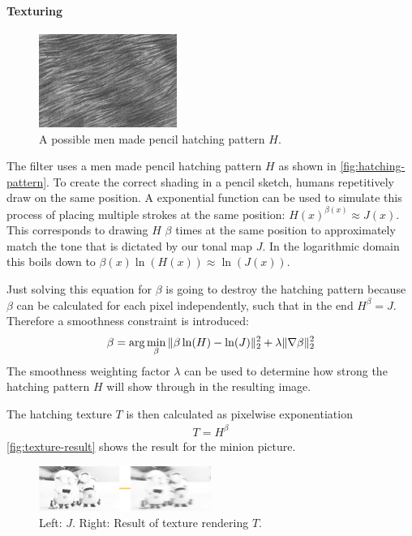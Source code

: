 \paragraph{Texturing}
\begin{figure}[htb]
  \centering
  \includegraphics[width=0.4\textwidth]{images/texture2.jpg}
  \caption{A possible men made pencil hatching pattern $H$.}
  \label{fig:hatching-pattern}
\end{figure}
The filter uses a men made pencil hatching pattern $H$ as shown in
\autoref{fig:hatching-pattern}. To create the correct shading in a pencil
sketch, humans repetitively draw on the same position. A exponential function
can be used to simulate this process of placing multiple strokes at the same
position: $H(x)^{\beta(x)} \approx J(x)$. This corresponds to drawing $H$
$\beta$ times at the same position to approximately match the tone that is
dictated by our tonal map $J$. In the logarithmic domain this boils down to
$\beta(x) \ln\left( H(x) \right) \approx \ln\left( J(x) \right)$.



Just solving this equation for $\beta$ is going to destroy the hatching
pattern because $\beta$ can be calculated for each pixel independently, such
that in the end $H^{\beta} = J$. Therefore a smoothness constraint is
introduced:
\begin{align}
  \beta = \arg \min_{\beta}\|\beta\ln(H) - \ln(J)\|_2^2 + \lambda
  \|\nabla \beta\|_2^2
  \label{eq:beta}
\end{align}
The smoothness weighting factor $\lambda$ can be used to determine how strong
the hatching pattern $H$ will show through in the resulting image.

The hatching texture $T$ is then calculated as pixelwise exponentiation
\begin{align*}
  T = H^{\beta}
\end{align*}
\autoref{fig:texture-result} shows the result for the minion picture.

\begin{figure}[htb]
  \centering
  \includegraphics[width=0.5\textwidth]{images/texture-result.png}
  \caption{Left: $J$. Right: Result of texture rendering $T$.}
  \label{fig:texture-result}
\end{figure}



